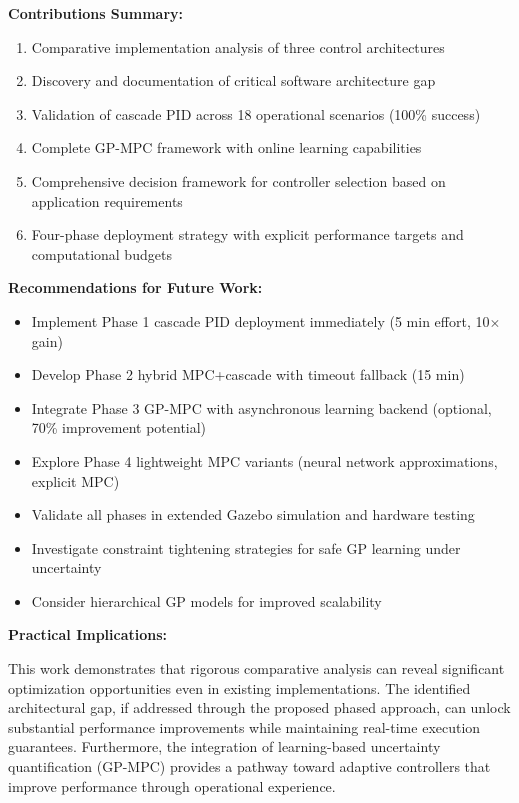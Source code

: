 \documentclass[journal]{IEEEtran}
\begin{document}
\textbf{Contributions Summary:}
\begin{enumerate}
    \item Comparative implementation analysis of three control architectures
    \item Discovery and documentation of critical software architecture gap
    \item Validation of cascade PID across 18 operational scenarios (100\% success)
    \item Complete GP-MPC framework with online learning capabilities
    \item Comprehensive decision framework for controller selection based on application requirements
    \item Four-phase deployment strategy with explicit performance targets and computational budgets
\end{enumerate}

\textbf{Recommendations for Future Work:}
\begin{itemize}
    \item Implement Phase 1 cascade PID deployment immediately (5 min effort, 10$\times$ gain)
    \item Develop Phase 2 hybrid MPC+cascade with timeout fallback (15 min)
    \item Integrate Phase 3 GP-MPC with asynchronous learning backend (optional, 70\% improvement potential)
    \item Explore Phase 4 lightweight MPC variants (neural network approximations, explicit MPC)
    \item Validate all phases in extended Gazebo simulation and hardware testing
    \item Investigate constraint tightening strategies for safe GP learning under uncertainty
    \item Consider hierarchical GP models for improved scalability
\end{itemize}

\textbf{Practical Implications:}

This work demonstrates that rigorous comparative analysis can reveal significant optimization opportunities even in existing implementations. The identified architectural gap, if addressed through the proposed phased approach, can unlock substantial performance improvements while maintaining real-time execution guarantees. Furthermore, the integration of learning-based uncertainty quantification (GP-MPC) provides a pathway toward adaptive controllers that improve performance through operational experience.
\end{document}

